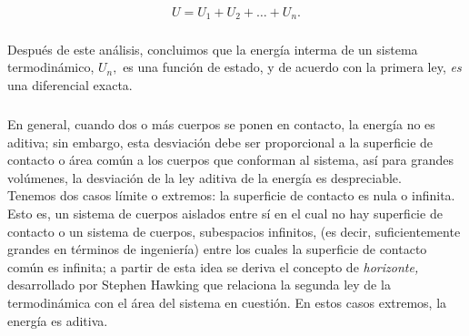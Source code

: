 \documentclass{article}
\theoremstyle{definition} \newtheorem{defi}{Definici\'on}
\theoremstyle{definition} \newtheorem{teo}{Teorema}
\theoremstyle{definition} \newtheorem{cor}{Corolario}
\begin{document}
$$U = U_1 + U_2 + \dots + U_n.$$
\subparagraph{}
Despu\'es de este an\'alisis, concluimos que la energ\'ia interma de un sistema termodin\'amico, $U_n,$ es una funci\'on de estado, y de acuerdo con la primera ley, \emph{es} una diferencial exacta.
\subparagraph{}
En general, cuando dos o m\'as cuerpos se ponen en contacto, la energ\'ia no es aditiva; sin embargo, esta desviaci\'on debe ser proporcional a la superficie de contacto o \'area com\'un a los cuerpos que conforman al sistema, as\'i para grandes vol\'umenes, la desviaci\'on de la ley aditiva de la energ\'ia es despreciable.\\
Tenemos dos casos l\'imite o extremos: la superficie de contacto es nula o infinita. Esto es, un sistema de cuerpos aislados entre s\'i en el cual no hay superficie de contacto o un sistema de cuerpos, subespacios infinitos, (es decir, suficientemente grandes en t\'erminos de ingenier\'ia) entre los cuales la superficie de contacto com\'un es infinita; a partir de esta idea se deriva el concepto de \emph{horizonte,} desarrollado por Stephen Hawking que relaciona la segunda ley de la termodin\'amica con el \'area del sistema en cuesti\'on. En estos casos extremos, la energ\'ia es aditiva.
\end{document}
